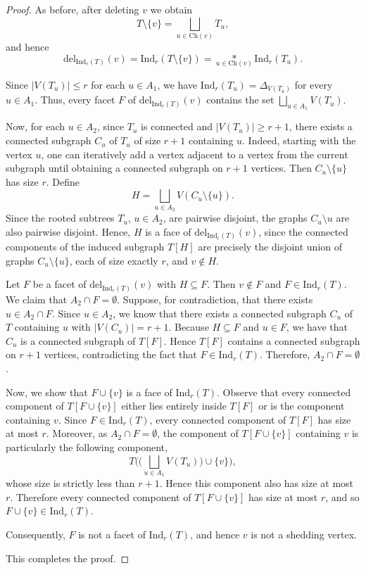 \documentclass[12pt,reqno]{amsart}
\theoremstyle{definition}
\def\Ind{\mathrm{Ind}}
\def\del{\mathrm{del}}
\begin{document}
\begin{proof}
As before, after deleting $v$ we obtain
\[
T \setminus \{v\}
=
\bigsqcup_{u \in \mathrm{Ch}(v)} T_u,
\]
and hence
\begin{equation}\label{eq: first del 1}
\del_{\Ind_r(T)}(v)
=
\Ind_r(T \setminus \{v\})
=
\underset{u \in \mathrm{Ch}(v)}{*} \Ind_r(T_u).
\end{equation}

Since $|V(T_u)| \le r$ for each $u \in A_1$, we have $\Ind_r(T_u) = \Delta_{V(T_u)}$ for every $u \in A_1$. Thus, every facet $F$ of $\del_{\Ind_r(T)}(v)$ contains the set $\bigsqcup\limits_{u \in A_1} V(T_u)$.

Now, for each $u \in A_2$, since $T_u$ is connected and $|V(T_u)| \ge r+1$, there exists a connected subgraph $C_u$ of $T_u$ of size $r+1$ containing $u$. Indeed, starting with the vertex $u$, one can iteratively add a vertex adjacent to a vertex from the current subgraph until obtaining a connected subgraph on $r+1$ vertices. Then $C_u \setminus \{u\}$ has size $r$. Define
\[
H = \bigsqcup\limits_{u \in A_2} V(C_u \setminus \{u\}).
\]
Since the rooted subtrees $T_u$, $u \in A_2$, are pairwise disjoint, the graphs $C_u \setminus u$ are also pairwise disjoint. Hence, $H$ is a face of $\del_{\Ind_r(T)}(v)$, since the connected components of the induced subgraph $T[H]$ are precisely the disjoint union of graphs $C_u \setminus \{u\}$, each of size exactly $r$, and $v \notin H$.

Let $F$ be a facet of $\del_{\Ind_r(T)}(v)$ with $H \subseteq F$. Then $v \notin F$ and $F \in \Ind_r(T)$. We claim that $A_2 \cap F = \emptyset$. Suppose, for contradiction, that there exists $u \in A_2 \cap F$. Since $u \in A_2$, we know that there exists a connected subgraph $C_u$ of $T$ containing $u$ with $|V(C_u)| = r+1$. Because $H \subseteq F$ and $u \in F$, we have that $C_u$ is a connected subgraph of $T[F]$. Hence $T[F]$ contains a connected subgraph on $r+1$ vertices, contradicting the fact that $F \in \Ind_r(T)$. Therefore, $A_2 \cap F = \emptyset$.

Now, we show that $F \cup \{v\}$ is a face of $\Ind_r(T)$. Observe that every connected component of $T[F \cup \{v\}]$ either lies entirely inside $T[F]$ or is the component containing $v$. Since $F \in \Ind_r(T)$, every connected component of $T[F]$ has size at most $r$. Moreover, as $A_2 \cap F = \emptyset$, the component of $T[F \cup \{v\}]$ containing $v$ is particularly the following component,
\[
T \Big( \Big(\bigsqcup_{u \in A_1} V(T_u)\Big)\cup \{v\} \Big),
\]
whose size is strictly less than $r+1$. Hence this component also has size at most $r$. Therefore every connected component of $T[F \cup \{v\}]$ has size at most $r$, and so $F \cup \{v\} \in \Ind_r(T)$.

Consequently, $F$ is not a facet of $\Ind_r(T)$, and hence $v$ is not a shedding vertex.

\medskip
\noindent
This completes the proof.
\end{proof}
\end{document}
